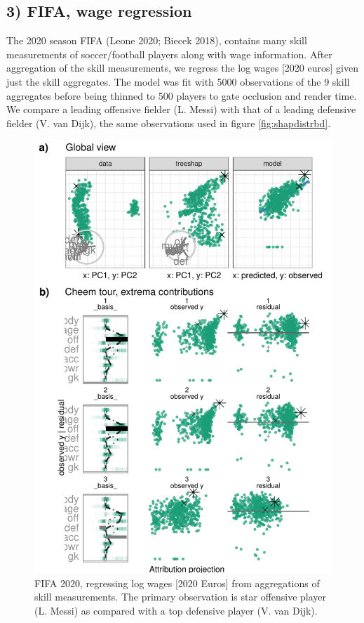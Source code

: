 \documentclass[
]{article}
\begin{document}
\hypertarget{fifa-wage-regression}{%
\subsection{3) FIFA, wage regression}\label{fifa-wage-regression}}

The 2020 season FIFA (Leone 2020; Biecek 2018), contains many skill measurements of soccer/football players along with wage information. After aggregation of the skill measurements, we regress the log wages {[}2020 euros{]} given just the skill aggregates. The model was fit with 5000 observations of the 9 skill aggregates before being thinned to 500 players to gate occlusion and render time. We compare a leading offensive fielder (L. Messi) with that of a leading defensive fielder (V. van Dijk), the same observations used in figure \ref{fig:shapdistrbd}.

\begin{figure}

{\centering \includegraphics[width=1\linewidth]{./figures/case_fifa} 

}

\caption{FIFA 2020, regressing log wages [2020 Euros] from aggregations of skill measurements. The primary observation is star offensive player (L. Messi) as compared with a top defensive player (V. van Dijk).}\label{fig:casefifa}
\end{figure}
\end{document}
